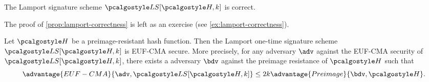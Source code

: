 \begin{proposition}\label{prop:lamport-correctness}
  The Lamport signature scheme $\algo{LS}[\algo{H}, k]$ is correct.
\end{proposition}

The proof of \autoref{prop:lamport-correctness} is left as an exercise (see \autoref{ex:lamport-correctness}).

\begin{theorem}\label{thm:ots-lamport-euf-cma}
    Let $\algo{H}$ be a preimage-resistant hash function.
    Then the Lamport one-time signature scheme $\algo{LS}[\algo{H}, k]$ is EUF-CMA secure.
    More precisely, for any \ppt adversary $\adv$ against the EUF-CMA security of $\algo{LS}[\algo{H, k}]$,
    there exists a \ppt adversary $\bdv$ against the preimage resistance of $\algo{H}$ such that
    \[
    \advantage{EUF-CMA}{\adv, \algo{LS}[\algo{H}, k]} \leq 2k\advantage{Preimage}{\bdv, \algo{H}}.
    \]
\end{theorem}

